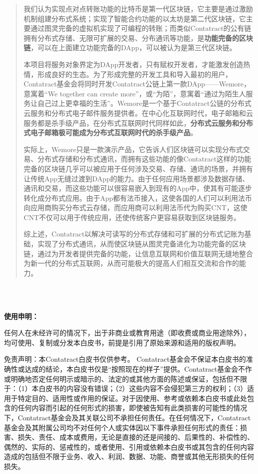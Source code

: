 \documentclass[a4paper,12pt]{article}
\begin{document}
\begin{abstract}
我们认为实现点对点转账功能的比特币是第一代区块链，它主要是通过激励机制组建分布式系统；实现了智能合约功能的以太坊是第二代区块链，它主要通过图灵完备的虚拟机实现了可编程的转账；而类似Contatract的公有链拥有分布式存储、无限可扩展的交易、分布通讯等功能，是\textbf{功能完备的区块链}，可以在上面建立功能完备的DApp，可以被认为是第三代区块链。

本项目将服务对象界定为DApp开发者，只有赋权开发者，才能激发创造热情，形成良好的生态。为了形成完整的开发工具和导入最初的用户，Contatract基金会将同时开发Contatract公链上第一款DApp——Wemore，意寓着“We together can create more”，或“为陌”，意寓着“通过为陌生人服务让自己过上更幸福的生活”。Wemore是一个基于Contatract公链的分布式云服务和分布式电子邮件服务提供者。在中心化互联网时代，电子邮箱和云服务都是杀手级产品，在分布式互联网时代同样如此，\textbf{分布式云服务和分布式电子邮箱极可能成为分布式互联网时代的杀手级产品}。

实际上，Wemore只是一款演示产品，它告诉人们区块链可以实现分布式交易、分布式存储和分布式通讯，而拥有这些功能的像Contatract这样的功能完备的区块链几乎可以被应用于任何涉及交易、存储、通讯的场景，并拥有让传统App无缝过渡到DApp的能力。由于任何应用场景都涉及数据存储、通讯和交易，而这些功能可以很容易嵌入到现有的App中，使其有可能逐步转化成分布式应用。由于App都有法币接入，这使各国的人们可以利用法币向应用商购买分布式云存储，而应用商可以利用法币代为购买CNT，这使CNT不仅可以用于传统应用，还使传统客户更容易获取到区块链服务。

综上述，Contatract以解决可读写的分布式存储和可扩展的分布式记账为基础，实现了分布式通讯，从而使区块链从图灵完备进化为功能完备的区块链，通过为开发者提供完备的功能，让信息互联网和价值互联网无缝地整合为新一代的分布式互联网，从而可能极大的提高人们相互交流和合作的能力。

\end{abstract}

\medskip
\noindent
 \\\\
\medskip
\noindent

\thispagestyle{empty}

\newpage
\thispagestyle{empty}

\noindent
\textbf{\large{使用申明：}}

任何人在未经许可的情况下，出于非商业或教育用途（即收费或商业用途除外），均可使用、复制或分发本白皮书，前提是引用了原始来源和适用的版权声明。

免责声明：本Contatract白皮书仅供参考。 Contatract基金会不保证本白皮书的准确性或达成的结论，本白皮书仅是“按照现在的样子”提供。Contatract基金会不作或明确地否定任何明示或暗示的、法定的或其他方面的陈述或保证，包括但不限于：（1）本白皮书的内容没有错误；（2）这些内容不会侵犯第三方的权利；（3）适用于特定目的、适用性或作用的保证。对于因使用、参考或依赖本白皮书或此处包含的任何内容而引起的任何形式的损害，即使被告知有此类损害的可能性的情况下，Contatract基金会及其关联公司不承担任何责任。在任何情况下，Contatract基金会及其附属公司均不对任何个人或实体因以下事件承担任何形式的责任：损害、损失、责任、成本或费用，无论是直接的还是间接的、后果性的、补偿性的、偶然的、实际的、惩戒性的，或者使用、引用或依赖本白皮书或其包含的任何内容造成的包括但不限于业务、收入、利润、数据、功能、商誉或其他无形损失的任何损失。
\end{document}

